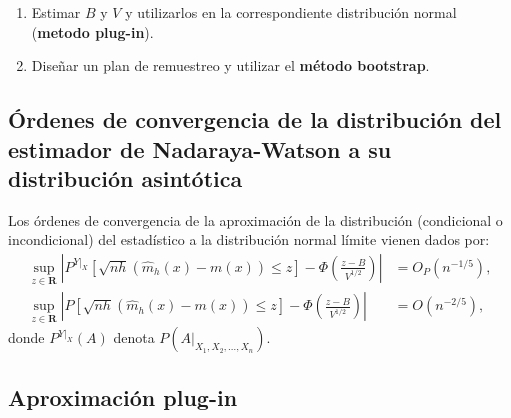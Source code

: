 \documentclass[]{book}
\theoremstyle{break}
\theoremstyle{definition}
\theoremstyle{definition}
\theoremstyle{definition}
\theoremstyle{remark}
\begin{document}
\begin{enumerate}
\def\labelenumi{\arabic{enumi}.}
\item
  Estimar \(B\) y \(V\) y utilizarlos en la correspondiente distribución
  normal (\textbf{metodo plug-in}).
\item
  Diseñar un plan de remuestreo y utilizar el \textbf{método bootstrap}.
\end{enumerate}

\subsection{Órdenes de convergencia de la distribución del estimador de
Nadaraya-Watson a su distribución
asintótica}\label{uxf3rdenes-de-convergencia-de-la-distribuciuxf3n-del-estimador-de-nadaraya-watson-a-su-distribuciuxf3n-asintuxf3tica}

Los órdenes de convergencia de la aproximación de la distribución
(condicional o incondicional) del estadístico a la distribución normal
límite vienen dados por: \[\begin{aligned}
\sup_{z\in \boldsymbol{R}}\left\vert P^{\left. Y\right\vert _{X}}\left[ 
\sqrt{nh}\left( \hat{m}_{h}\left( x \right) -m\left( x \right) \right) \leq z
\right] -\Phi \left( \frac{z-B}{V^{1/2}} \right) \right\vert &= O_{P}\left(
n^{-1/5} \right), \\
\sup_{z\in \boldsymbol{R}}\left\vert P\left[ \sqrt{nh}\left( \hat{m}
_{h}\left( x \right) -m\left( x \right) \right) \leq z\right] -\Phi \left( 
\frac{z-B}{V^{1/2}} \right) \right\vert &= O\left( n^{-2/5} \right),
\end{aligned}\] donde \(P^{\left. Y\right\vert_{X}}\left( A \right)\)
denota \(P\left( \left. A \right\vert_{X_1,X_2,\ldots ,X_n} \right)\).

\subsection{Aproximación plug-in}\label{aproximaciuxf3n-plug-in-1}
\end{document}

